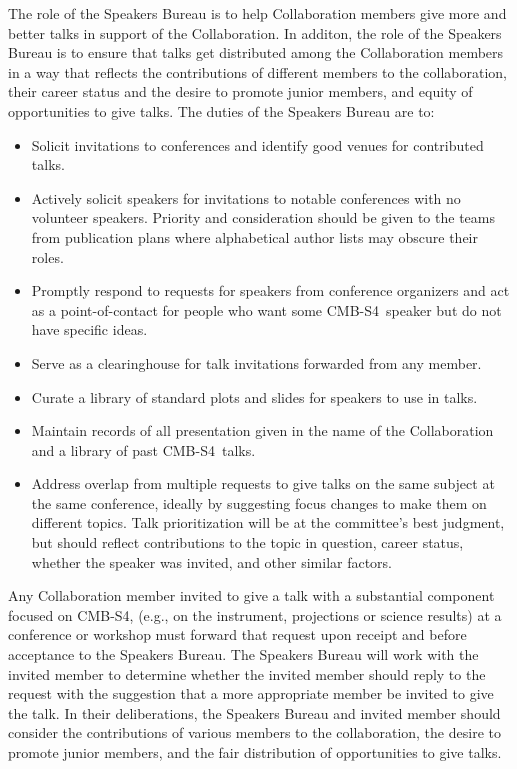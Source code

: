 \documentclass[12pt]{article}
\newcommand\collabname{CMB-S4}
\begin{document}
The role of the Speakers Bureau is to help Collaboration members give more and better talks in support of the Collaboration. In additon, the role of the Speakers Bureau is to ensure that talks get distributed among the Collaboration members in a way that reflects the contributions of different members to the collaboration, their career status and the desire to promote junior members, and equity of opportunities to give talks. The duties of the Speakers Bureau are to:
\begin{itemize}

\item Solicit invitations to conferences and identify good venues for contributed talks.

\item Actively solicit speakers for invitations to notable conferences with no volunteer speakers. Priority and consideration should be given to the teams from publication plans where alphabetical author lists may obscure their roles.

\item Promptly respond to requests for speakers from conference organizers and act as a point-of-contact for people who want some \collabname\ speaker but do not have specific ideas.

\item Serve as a clearinghouse for talk invitations forwarded from any member.

\item Curate a library of standard plots and slides for speakers to use in talks.

\item Maintain records of all presentation given in the name of the Collaboration and a library of past \collabname\  talks.

\item Address overlap from multiple requests to give talks on the same subject at the same conference, ideally by suggesting focus changes to make them on different topics. Talk prioritization will be at the committee's best judgment, but should reflect contributions to the topic in question, career status, whether the speaker was invited, and other similar factors.

\end{itemize}

Any Collaboration member invited to give a talk with a substantial component focused on \collabname, (e.g., on the instrument, projections or science results) at a conference or workshop must forward that request upon receipt and before acceptance to the Speakers Bureau.  The Speakers Bureau will work with the invited member to determine whether the invited member should reply to the request with the suggestion that a more appropriate member be invited to give the talk. In their deliberations, the Speakers Bureau and invited member should consider the contributions of various members to the collaboration, the desire to promote junior members, and the fair distribution of opportunities to give talks.
\end{document}
